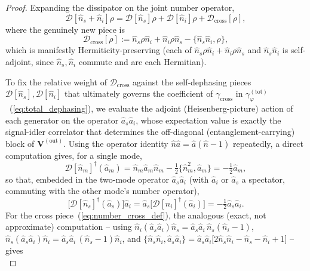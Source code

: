 \documentclass[journal]{IEEEtran}
\begin{document}
\begin{proof}
Expanding the dissipator on the joint number operator,
\begin{equation}\label{eq:number_cross_split}
\mathcal D[\hat n_s+\hat n_i]\rho = \mathcal D[\hat n_s]\rho + \mathcal D[\hat n_i]\rho + \mathcal D_{\text{cross}}[\rho],
\end{equation}
where the genuinely new piece is
\begin{equation}\label{eq:number_cross_def}
\mathcal D_{\text{cross}}[\rho] := \hat n_s\rho\hat n_i + \hat n_i\rho\hat n_s - \{\hat n_s\hat n_i,\rho\},
\end{equation}
which is manifestly Hermiticity-preserving (each of $\hat n_s\rho\hat n_i+\hat n_i\rho\hat n_s$ and $\hat n_s\hat n_i$ is self-adjoint, since $\hat n_s,\hat n_i$ commute and are each Hermitian).

To fix the relative weight of $\mathcal D_{\text{cross}}$ against the self-dephasing pieces $\mathcal D[\hat n_s],\mathcal D[\hat n_i]$ that ultimately governs the coefficient of $\gamma_{\text{cross}}$ in $\gamma_\varphi^{(\text{tot})}$~(\ref{eq:total_dephasing}), we evaluate the adjoint (Heisenberg-picture) action of each generator on the operator $\hat a_s\hat a_i$, whose expectation value is exactly the signal-idler correlator that determines the off-diagonal (entanglement-carrying) block of $\mathbf V^{(\text{out})}$. Using the operator identity $\hat n\hat a = \hat a(\hat n-1)$ repeatedly, a direct computation gives, for a single mode,
\begin{equation}\label{eq:self_dephasing_adjoint}
\mathcal D[\hat n_m]^\dagger(\hat a_m) = \hat n_m\hat a_m\hat n_m - \tfrac12\{\hat n_m^2,\hat a_m\} = -\tfrac12\hat a_m,
\end{equation}
so that, embedded in the two-mode operator $\hat a_s\hat a_i$ (with $\hat a_i$ or $\hat a_s$ a spectator, commuting with the other mode's number operator),
\begin{equation}
\big[\mathcal D[\hat n_s]^\dagger(\hat a_s)\big]\hat a_i = \hat a_s\big[\mathcal D[\hat n_i]^\dagger(\hat a_i)\big] = -\tfrac12\hat a_s\hat a_i.
\end{equation}
For the cross piece~(\ref{eq:number_cross_def}), the analogous (exact, not approximate) computation -- using $\hat n_i(\hat a_s\hat a_i)\hat n_s=\hat a_s\hat a_i\,\hat n_s(\hat n_i-1)$, $\hat n_s(\hat a_s\hat a_i)\hat n_i=\hat a_s\hat a_i\,(\hat n_s-1)\hat n_i$, and $\{\hat n_s\hat n_i,\hat a_s\hat a_i\}=\hat a_s\hat a_i\big[2\hat n_s\hat n_i-\hat n_s-\hat n_i+1\big]$ -- gives
\begin{equation}\label{eq:cross_dephasing_adjoint}

\end{equation}
\end{proof}
\end{document}
